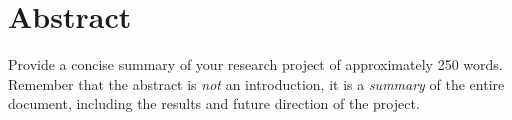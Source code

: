 \chapter*{Abstract} 

Provide a concise summary of your  research project of approximately 250 words. 
Remember that the abstract is {\it not\/} an introduction, it is a {\it summary\/} of the entire document, including the results and future direction of the project.